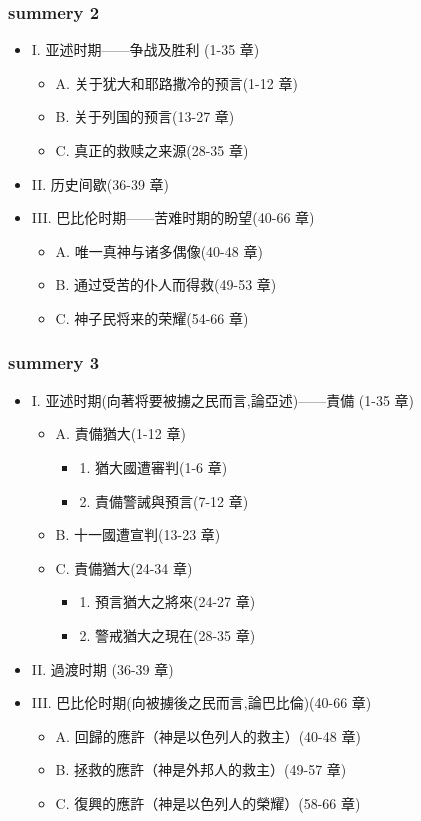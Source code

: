 \subsubsection{summery 2}
\begin{itemize}
\item I. 亚述时期——争战及胜利 (1-35 章)
\begin{itemize}
\item A. 关于犹大和耶路撒冷的预言(1-12 章)
\item B. 关于列国的预言(13-27 章)
\item C. 真正的救赎之来源(28-35 章)
\end{itemize}
\item II. 历史间歇(36-39 章)
\item III. 巴比伦时期——苦难时期的盼望(40-66 章)
\begin{itemize}
\item A. 唯一真神与诸多偶像(40-48 章)
\item B. 通过受苦的仆人而得救(49-53 章)
\item C. 神子民将来的荣耀(54-66 章) 
\end{itemize}
\end{itemize}

\subsubsection{summery 3}
\begin{itemize}
\item I. 亚述时期(向著将要被擄之民而言,論亞述)——責備 (1-35 章)
\begin{itemize}
\item A. 責備猶大(1-12 章)
\begin{itemize}
\item 1. 猶大國遭審判(1-6 章)
\item 2. 責備警誡與預言(7-12 章)
\end{itemize}
\item B. 十一國遭宣判(13-23 章)
\item C. 責備猶大(24-34 章)
\begin{itemize}
\item 1. 預言猶大之將來(24-27 章)
\item 2. 警戒猶大之現在(28-35 章)
\end{itemize}
\end{itemize}
\item II. 過渡时期 (36-39 章)
\item III. 巴比伦时期(向被擄後之民而言,論巴比倫)(40-66 章)
\begin{itemize}
\item A. 回歸的應許（神是以色列人的救主）(40-48 章)
\item B. 拯救的應許（神是外邦人的救主）(49-57 章)
\item C. 復興的應許（神是以色列人的榮耀）(58-66 章) 
\end{itemize}
\end{itemize}


